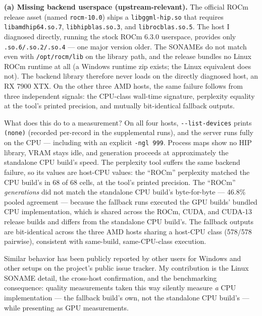 \documentclass[11pt]{article}
\begin{document}
\textbf{(a) Missing backend userspace (upstream-relevant).} The
official ROCm release asset (named \texttt{rocm-10.0}) ships a
\texttt{libggml-hip.so} that requires \texttt{libamdhip64.so.7},
\texttt{libhipblas.so.3}, and \texttt{librocblas.so.5}. The host I
diagnosed directly, running the stock ROCm 6.3.0 userspace, provides
only \texttt{.so.6/.so.2/.so.4} --- one major version older. The
SONAMEs do not match even with \texttt{/opt/rocm/lib} on the library
path, and the release bundles no Linux ROCm runtime at all (a Windows
runtime zip exists; the Linux equivalent does not). The backend
library therefore never loads on the directly diagnosed host, an RX
7900 XTX. On the other three AMD hosts, the same failure follows from
three independent signals: the CPU-class wall-time signature,
perplexity equality at the tool's printed precision, and mutually
bit-identical fallback outputs.

What does this do to a measurement? On all four hosts,
\texttt{-{}-list-devices} prints \texttt{(none)} (recorded per-record
in the supplemental runs), and the server runs fully on the CPU ---
including with an explicit \texttt{-ngl 999}. Process maps show no HIP
library, VRAM stays idle, and generation proceeds at approximately the
standalone CPU build's speed. The perplexity tool suffers the same
backend failure, so its values are host-CPU values: the ``ROCm''
perplexity matched the CPU build's in 68 of 68 cells, at the tool's
printed precision. The ``ROCm'' \emph{generations} did not match the
standalone CPU build's byte-for-byte --- 46.8\% pooled agreement ---
because the fallback runs executed the GPU builds' bundled CPU
implementation, which is shared across the ROCm, CUDA, and CUDA-13
release builds and differs from the standalone CPU build's. The
fallback outputs are bit-identical across the three AMD hosts sharing
a host-CPU class (578/578 pairwise), consistent with same-build,
same-CPU-class execution.

Similar behavior has been publicly reported by other users for Windows
and other setups on the project's public issue tracker. My
contribution is the Linux SONAME detail, the cross-host confirmation,
and the benchmarking consequence: quality measurements taken this way
silently measure \emph{a} CPU implementation --- the fallback build's
own, not the standalone CPU build's --- while presenting as GPU
measurements.
\end{document}
